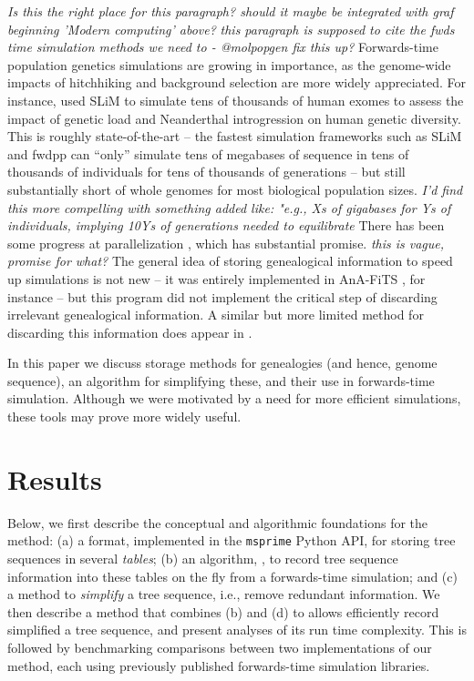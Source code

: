 \documentclass{article}
\newcommand{\msprime}{\texttt{msprime}}
\newcommand{\plr}[1]{{\em \color{blue} #1}}
\newcommand{\jda}[1]{{\em \color{cyan} #1}}
\begin{document}
\jda{Is this the right place for this paragraph? should it maybe be integrated
	with graf beginning 'Modern computing' above?}
\plr{this paragraph is supposed to cite the fwds time simulation methods we need to - @molpopgen fix this up?}
Forwards-time population genetics simulations are growing in importance,
as the genome-wide impacts of hitchhiking and background selection are more widely appreciated.
For instance, \citet{harris2016genetic} used SLiM \citep{haller2017flexible} to simulate tens of thousands of human exomes
to assess the impact of genetic load and Neanderthal introgression on human genetic diversity.
This is roughly state-of-the-art 
-- the fastest simulation frameworks such as SLiM and fwdpp \citep{fwdpp}
can ``only'' simulate tens of megabases of sequence in tens of thousands of individuals
for tens of thousands of generations --
but still substantially short of whole genomes for most biological population sizes.
\jda{I'd find this more compelling with something added like: "e.g., Xs of
	gigabases for Ys of individuals, implying 10Ys of generations needed to
	equilibrate}
There has been some progress at parallelization \citep{lawrie2017accelerating},
which has substantial promise.
\jda{this is vague, promise for what?}
The general idea of storing genealogical information to speed up simulations is not new --
it was entirely implemented in AnA-FiTS \citep{aberer2013rapid}, for instance --
but this program did not implement the critical step of discarding irrelevant genealogical information.
A similar but more limited method for discarding this information does appear in \citet{padhukasahasram2008exploring}.

In this paper we discuss storage methods for genealogies (and hence, genome sequence),
an algorithm for simplifying these,
and their use in forwards-time simulation.
Although we were motivated by a need for more efficient simulations,
these tools may prove more widely useful.


\section*{Results}


Below, we first describe the conceptual and algorithmic foundations for the method:
(a) a format, implemented in the \msprime{} Python API,
for storing tree sequences in several \emph{tables};
(b) an algorithm, , to record tree sequence information into these tables on the fly
    from a forwards-time simulation;
and (c) a method to \emph{simplify} a tree sequence, i.e., remove redundant information.
We then describe a method that combines (b) and (d) to allows efficiently record simplified a tree sequence,
and present analyses of its run time complexity.
This is followed by benchmarking comparisons between two implementations of our method,
each using previously published forwards-time simulation libraries.
\end{document}
